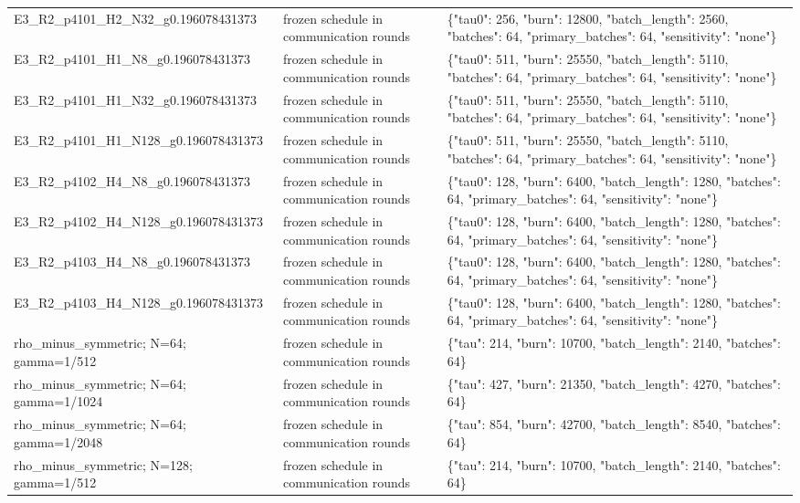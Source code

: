 \begin{tabular}{lll}
E3\_R2\_p4101\_H2\_N32\_g0.196078431373 & frozen schedule in communication rounds & \{"tau0": 256, "burn": 12800, "batch\_length": 2560, "batches": 64, "primary\_batches": 64, "sensitivity": "none"\} \\
E3\_R2\_p4101\_H1\_N8\_g0.196078431373 & frozen schedule in communication rounds & \{"tau0": 511, "burn": 25550, "batch\_length": 5110, "batches": 64, "primary\_batches": 64, "sensitivity": "none"\} \\
E3\_R2\_p4101\_H1\_N32\_g0.196078431373 & frozen schedule in communication rounds & \{"tau0": 511, "burn": 25550, "batch\_length": 5110, "batches": 64, "primary\_batches": 64, "sensitivity": "none"\} \\
E3\_R2\_p4101\_H1\_N128\_g0.196078431373 & frozen schedule in communication rounds & \{"tau0": 511, "burn": 25550, "batch\_length": 5110, "batches": 64, "primary\_batches": 64, "sensitivity": "none"\} \\
E3\_R2\_p4102\_H4\_N8\_g0.196078431373 & frozen schedule in communication rounds & \{"tau0": 128, "burn": 6400, "batch\_length": 1280, "batches": 64, "primary\_batches": 64, "sensitivity": "none"\} \\
E3\_R2\_p4102\_H4\_N128\_g0.196078431373 & frozen schedule in communication rounds & \{"tau0": 128, "burn": 6400, "batch\_length": 1280, "batches": 64, "primary\_batches": 64, "sensitivity": "none"\} \\
E3\_R2\_p4103\_H4\_N8\_g0.196078431373 & frozen schedule in communication rounds & \{"tau0": 128, "burn": 6400, "batch\_length": 1280, "batches": 64, "primary\_batches": 64, "sensitivity": "none"\} \\
E3\_R2\_p4103\_H4\_N128\_g0.196078431373 & frozen schedule in communication rounds & \{"tau0": 128, "burn": 6400, "batch\_length": 1280, "batches": 64, "primary\_batches": 64, "sensitivity": "none"\} \\
rho\_minus\_symmetric; N=64; gamma=1/512 & frozen schedule in communication rounds & \{"tau": 214, "burn": 10700, "batch\_length": 2140, "batches": 64\} \\
rho\_minus\_symmetric; N=64; gamma=1/1024 & frozen schedule in communication rounds & \{"tau": 427, "burn": 21350, "batch\_length": 4270, "batches": 64\} \\
rho\_minus\_symmetric; N=64; gamma=1/2048 & frozen schedule in communication rounds & \{"tau": 854, "burn": 42700, "batch\_length": 8540, "batches": 64\} \\
rho\_minus\_symmetric; N=128; gamma=1/512 & frozen schedule in communication rounds & \{"tau": 214, "burn": 10700, "batch\_length": 2140, "batches": 64\} \\

\end{tabular}
